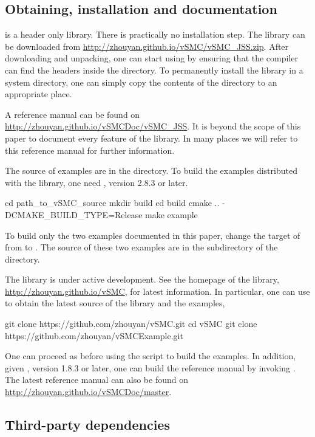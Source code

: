 \documentclass[11pt, fontset=Minion, showoverfull,
bib, mintcode, minted=cache]{marticle}
\begin{document}
\subsection{Obtaining, installation and documentation}

\vsmc is a header only library. There is practically no installation step. The
library can be downloaded from
\url{http://zhouyan.github.io/vSMC/vSMC_JSS.zip}. After downloading and
unpacking, one can start using \vsmc by ensuring that the compiler can find
the headers inside the  directory. To permanently install
the library in a system directory, one can simply copy the contents of the
 directory to an appropriate place.

A reference manual can be found on
\url{http://zhouyan.github.io/vSMCDoc/vSMC_JSS}. It is beyond the scope of
this paper to document every feature of the library. In many places we will
refer to this reference manual for further information.

The source of examples are in the  directory. To build
the examples distributed with the library, one need \ccmake, version 2.8.3 or
later.
\begin{shcode}
cd path_to_vSMC_source
mkdir build
cd build
cmake .. -DCMAKE_BUILD_TYPE=Release
make example
\end{shcode}
To build only the two examples documented in this paper, change the target of
 from  to . The source of
these two examples are in the  subdirectory of the
 directory.

The library is under active development. See the homepage of the library,
\url{http://zhouyan.github.io/vSMC}, for latest information. In particular,
one can use \cgit to obtain the latest source of the library and the examples,
\begin{shcode}
git clone https://github.com/zhouyan/vSMC.git
cd vSMC
git clone https://github.com/zhouyan/vSMCExample.git
\end{shcode}
One can proceed as before using the \cmake script to build the examples. In
addition, given \cdoxygen, version 1.8.3 or later, one can build the reference
manual by invoking . The latest reference manual can also
be found on \url{http://zhouyan.github.io/vSMCDoc/master}.

\subsection{Third-party dependencies}
\end{document}
